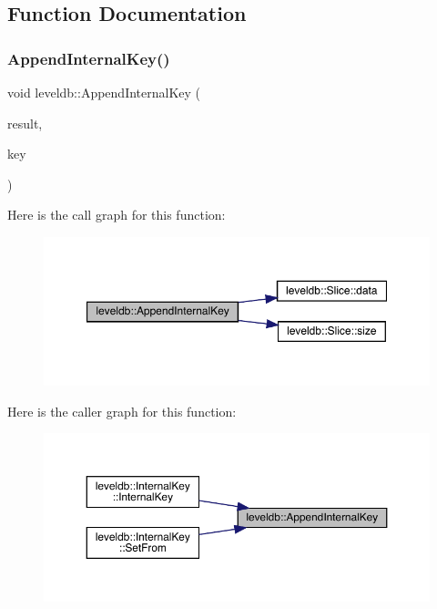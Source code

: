 \subsection{Function Documentation}
\mbox{\label{namespaceleveldb_a7192bb79e7fa6ba01490473941386534}} 
\subsubsection{\texorpdfstring{AppendInternalKey()}{AppendInternalKey()}}
{\footnotesize\ttfamily void leveldb\+::\+Append\+Internal\+Key (\begin{DoxyParamCaption}\item[{std\+::string $\ast$}]{result,  }\item[{const \mbox{\hyperlink{structleveldb_1_1_parsed_internal_key}{Parsed\+Internal\+Key}} \&}]{key }\end{DoxyParamCaption})}

Here is the call graph for this function\+:
\nopagebreak
\begin{figure}[H]
\begin{center}
\leavevmode
\includegraphics[width=350pt]{namespaceleveldb_a7192bb79e7fa6ba01490473941386534_cgraph}
\end{center}
\end{figure}
Here is the caller graph for this function\+:
\nopagebreak
\begin{figure}[H]
\begin{center}
\leavevmode
\includegraphics[width=350pt]{namespaceleveldb_a7192bb79e7fa6ba01490473941386534_icgraph}
\end{center}
\end{figure}
\mbox{\label{namespaceleveldb_af9cf6ec167c9b6f25fd050ab6fb67a90}} 
